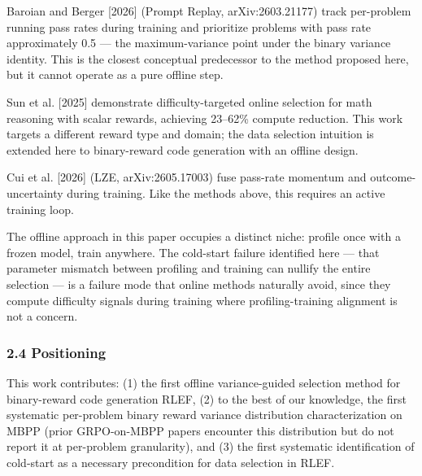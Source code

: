 Baroian and Berger [2026] (Prompt Replay, arXiv:2603.21177) track per-problem running pass rates during training and prioritize problems with pass rate approximately 0.5 --- the maximum-variance point under the binary variance identity. This is the closest conceptual predecessor to the method proposed here, but it cannot operate as a pure offline step.

Sun et al. [2025] demonstrate difficulty-targeted online selection for math reasoning with scalar rewards, achieving 23--62\% compute reduction. This work targets a different reward type and domain; the data selection intuition is extended here to binary-reward code generation with an offline design.

Cui et al. [2026] (LZE, arXiv:2605.17003) fuse pass-rate momentum and outcome-uncertainty during training. Like the methods above, this requires an active training loop.

The offline approach in this paper occupies a distinct niche: profile once with a frozen model, train anywhere. The cold-start failure identified here --- that parameter mismatch between profiling and training can nullify the entire selection --- is a failure mode that online methods naturally avoid, since they compute difficulty signals during training where profiling-training alignment is not a concern.

\subsubsection{2.4 Positioning}

This work contributes: (1) the first offline variance-guided selection method for binary-reward code generation RLEF, (2) to the best of our knowledge, the first systematic per-problem binary reward variance distribution characterization on MBPP (prior GRPO-on-MBPP papers encounter this distribution but do not report it at per-problem granularity), and (3) the first systematic identification of cold-start as a necessary precondition for data selection in RLEF.

